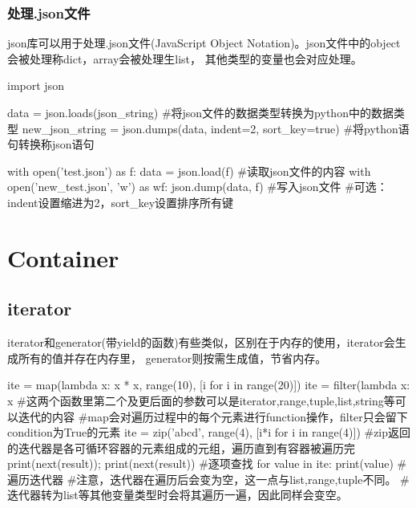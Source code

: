 \documentclass{article}
\begin{document}
      \subsubsection{处理.json文件}
        json库可以用于处理.json文件(JavaScript Object Notation)。json文件中的object会被处理称dict，array会被处理生list，
        其他类型的变量也会对应处理。
        \begin{codeblock}[language=python, caption={json module}]
          import json

          data = json.loads(json_string) #将json文件的数据类型转换为python中的数据类型
          new_json_string = json.dumps(data, indent=2, sort_key=true) #将python语句转换称json语句

          with open('test.json') as f:
              data = json.load(f) #读取json文件的内容
          with open('new_test.json', 'w') as wf:
              json.dump(data, f) #写入json文件
          #可选：indent设置缩进为2，sort\_key设置排序所有键
        \end{codeblock}

        
  \section{Container}

    \subsection{iterator}
      iterator和generator(带yield的函数)有些类似，区别在于内存的使用，iterator会生成所有的值并存在内存里，
      generator则按需生成值，节省内存。
      \begin{codeblock}[language=python, caption={iterator}]
        ite = map(lambda x: x * x, range(10), [i for i in range(20)])
        ite = filter(lambda x: x %
        #这两个函数里第二个及更后面的参数可以是iterator,range,tuple,list,string等可以迭代的内容
        #map会对遍历过程中的每个元素进行function操作，filter只会留下condition为True的元素
        ite = zip('abcd', range(4), [i*i for i in range(4)])
        #zip返回的迭代器是各可循环容器的元素组成的元组，遍历直到有容器被遍历完
        print(next(result)); print(next(result)) #逐项查找
        for value in ite:
          print(value) #遍历迭代器
        #注意，迭代器在遍历后会变为空，这一点与list,range,tuple不同。
        #迭代器转为list等其他变量类型时会将其遍历一遍，因此同样会变空。
      \end{codeblock}
\end{document}
